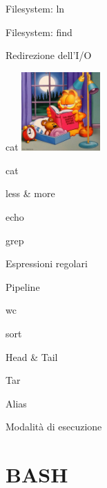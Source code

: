 \documentclass{beamer}
\begin{document}
    \begin{frame}{Filesystem: ln}
    \end{frame}

    \begin{frame}{Filesystem: find}
    \end{frame}

    \begin{frame}{Redirezione dell'I/O}
    \end{frame}

    \begin{frame}{cat}
        \centering
        \includegraphics[height=3cm, keepaspectratio]{images/garfield.jpg}

        \begin{block}{cat}
        \end{block}
    \end{frame}

    \begin{frame}{less \& more}
    \end{frame}

    \begin{frame}{echo}
    \end{frame}

    \begin{frame}{grep}
    \end{frame}

    \begin{frame}{Espressioni regolari}
    \end{frame}

    \begin{frame}{Pipeline}
    \end{frame}

    \begin{frame}{wc}
    \end{frame}

    \begin{frame}{sort}
    \end{frame}

    \begin{frame}{Head \& Tail}
    \end{frame}

    \begin{frame}{Tar}
    \end{frame}

    \begin{frame}{Alias}
    \end{frame}

    \begin{frame}{Modalità di esecuzione}
    \end{frame}

    \section{BASH}


    
\end{document}
